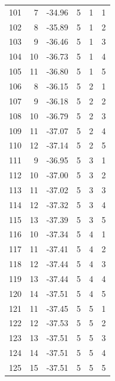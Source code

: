 \begin{longtable}{lrrrrr}
101 & 7 & -34.96 & 5 & 1 & 1 \\
102 & 8 & -35.89 & 5 & 1 & 2 \\
103 & 9 & -36.46 & 5 & 1 & 3 \\
104 & 10 & -36.73 & 5 & 1 & 4 \\
105 & 11 & -36.80 & 5 & 1 & 5 \\
106 & 8 & -36.15 & 5 & 2 & 1 \\
107 & 9 & -36.18 & 5 & 2 & 2 \\
108 & 10 & -36.79 & 5 & 2 & 3 \\
109 & 11 & -37.07 & 5 & 2 & 4 \\
110 & 12 & -37.14 & 5 & 2 & 5 \\
111 & 9 & -36.95 & 5 & 3 & 1 \\
112 & 10 & -37.00 & 5 & 3 & 2 \\
113 & 11 & -37.02 & 5 & 3 & 3 \\
114 & 12 & -37.32 & 5 & 3 & 4 \\
115 & 13 & -37.39 & 5 & 3 & 5 \\
116 & 10 & -37.34 & 5 & 4 & 1 \\
117 & 11 & -37.41 & 5 & 4 & 2 \\
118 & 12 & -37.44 & 5 & 4 & 3 \\
119 & 13 & -37.44 & 5 & 4 & 4 \\
120 & 14 & -37.51 & 5 & 4 & 5 \\
121 & 11 & -37.45 & 5 & 5 & 1 \\
122 & 12 & -37.53 & 5 & 5 & 2 \\
123 & 13 & -37.51 & 5 & 5 & 3 \\
124 & 14 & -37.51 & 5 & 5 & 4 \\
125 & 15 & -37.51 & 5 & 5 & 5 \\
\end{longtable}
